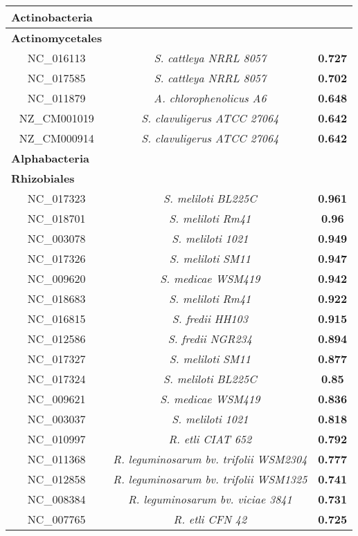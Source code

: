 	  
	  \begin{landscape}
	  \thispagestyle{empty}
	  \begin{table}
	  \begin{minipage}[t]{0.4\textwidth}
	  \vspace{-3.5cm}
	  	 \begin{tiny}
	  	 	  \hspace{-2cm}
	  \begin{tabular}{c>{\itshape}c>{\bfseries}c}
\multicolumn{1}{l}{\textbf{Actinobacteria}}\\
\hline
\multicolumn{1}{l}{\textbf{Actinomycetales}}\\
NC\_016113&S. cattleya NRRL 8057&0.727\\
NC\_017585&S. cattleya NRRL 8057&0.702\\
NC\_011879&A. chlorophenolicus A6&0.648\\
NZ\_CM001019&S. clavuligerus ATCC 27064&0.642\\
NZ\_CM000914&S. clavuligerus ATCC 27064&0.642\\
\multicolumn{1}{l}{\textbf{Alphabacteria}}\\
\hline
\multicolumn{1}{l}{\textbf{Rhizobiales}}\\
NC\_017323&S. meliloti BL225C&0.961\\
NC\_018701&S. meliloti Rm41&0.96\\
NC\_003078&S. meliloti 1021&0.949\\
NC\_017326&S. meliloti SM11&0.947\\
NC\_009620&S. medicae WSM419&0.942\\
NC\_018683&S. meliloti Rm41&0.922\\
NC\_016815&S. fredii HH103&0.915\\
NC\_012586&S. fredii NGR234&0.894\\
NC\_017327&S. meliloti SM11&0.877\\
NC\_017324&S. meliloti BL225C&0.85\\
NC\_009621&S. medicae WSM419&0.836\\
NC\_003037&S. meliloti 1021&0.818\\
NC\_010997&R. etli CIAT 652&0.792\\
NC\_011368&R. leguminosarum bv. trifolii WSM2304&0.777\\
NC\_012858&R. leguminosarum bv. trifolii WSM1325&0.741\\
NC\_008384&R. leguminosarum bv. viciae 3841&0.731\\
NC\_007765&R. etli CFN 42&0.725\\

\end{tabular}
\end{tiny}
\end{minipage}
\end{table}
\end{landscape}
